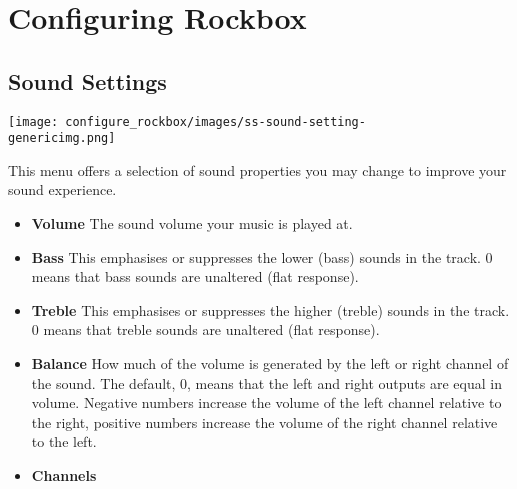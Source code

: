 \chapter{Configuring Rockbox}

\section{Sound Settings}
\begin{center}
\texttt{[image: configure\_rockbox/images/ss-sound-setting-\\genericimg.png]}
\end{center}

This menu offers a selection of sound properties you may change to improve your sound experience.

\begin{itemize}
\item \textbf{Volume}
  The sound volume your music is played at.
\item \textbf{Bass}
  This emphasises or suppresses the lower (bass) sounds in the track.  0 means that bass sounds are unaltered (flat response).
\item \textbf{Treble}
This emphasises or suppresses the higher (treble) sounds in the track.  0 means that treble sounds are unaltered (flat response).
\item \textbf{Balance}
  How much of the volume is generated by the left or right channel of the sound.  The default, 0, means that the left and right outputs are equal in volume.  Negative numbers increase the volume of the left channel relative to the right, positive numbers increase the volume of the right channel relative to the left.
\item \textbf{Channels}
  

\end{itemize}
